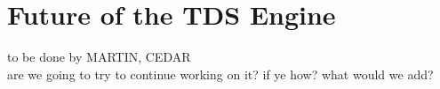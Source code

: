 \section{Future of the TDS Engine}
to be done by MARTIN, CEDAR \\
are we going to try to continue working on it? if ye how? what would we add?
